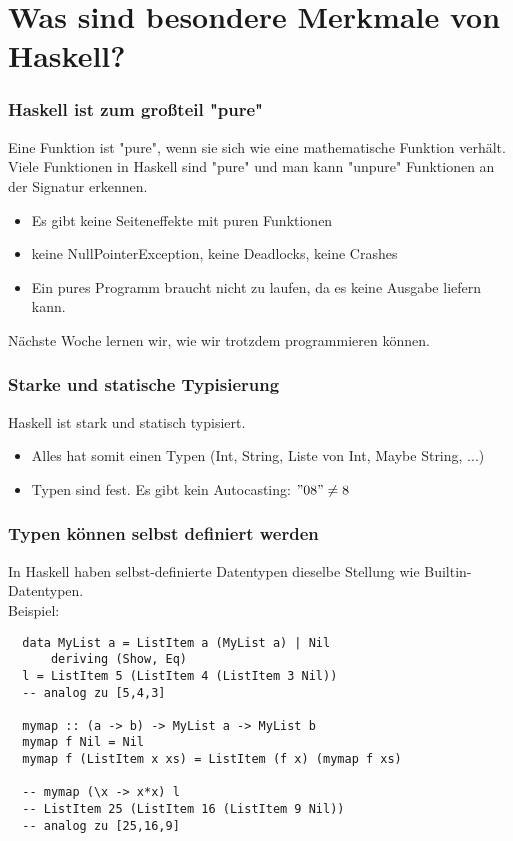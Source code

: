\documentclass{beamer}
\begin{document}
\section{Was sind besondere Merkmale von Haskell?}

\begin{frame}[fragile]
 \frametitle{Haskell ist zum großteil "pure"}
 Eine Funktion ist "pure", wenn sie sich wie eine mathematische Funktion verhält. Viele Funktionen in Haskell sind "pure" und man kann "unpure" Funktionen an der Signatur erkennen.\\\vspace*{0.5cm}
 \pause
 \begin{itemize}
  \item Es gibt keine Seiteneffekte mit puren Funktionen
  \pause
  \item keine NullPointerException, keine Deadlocks, keine Crashes
  \pause
  \item Ein pures Programm braucht nicht zu laufen, da es keine Ausgabe liefern kann.
  \pause
 \end{itemize}
 Nächste Woche lernen wir, wie wir trotzdem programmieren können.
\end{frame}


\begin{frame}[fragile]
 \frametitle{Starke und statische Typisierung}
 Haskell ist stark und statisch typisiert.\\\vspace*{0.5cm}
 \pause
 \begin{itemize}
  \item Alles hat somit einen Typen (Int, String, Liste von Int, Maybe String, ...)
  \pause
  \item Typen sind fest. Es gibt kein Autocasting: $"08" \neq 8$
 \end{itemize}
\end{frame}

\begin{frame}[fragile]
 \frametitle{Typen können selbst definiert werden}
 In Haskell haben selbst-definierte Datentypen dieselbe Stellung wie Builtin-Datentypen.\\\vspace*{0.5cm}
 \pause
 Beispiel:
 \pause
 \begin{lstlisting}
  data MyList a = ListItem a (MyList a) | Nil
      deriving (Show, Eq)
  l = ListItem 5 (ListItem 4 (ListItem 3 Nil))
  -- analog zu [5,4,3]
 
  mymap :: (a -> b) -> MyList a -> MyList b
  mymap f Nil = Nil
  mymap f (ListItem x xs) = ListItem (f x) (mymap f xs)

  -- mymap (\x -> x*x) l
  -- ListItem 25 (ListItem 16 (ListItem 9 Nil))
  -- analog zu [25,16,9]

 \end{lstlisting}
\end{frame}
\end{document}
